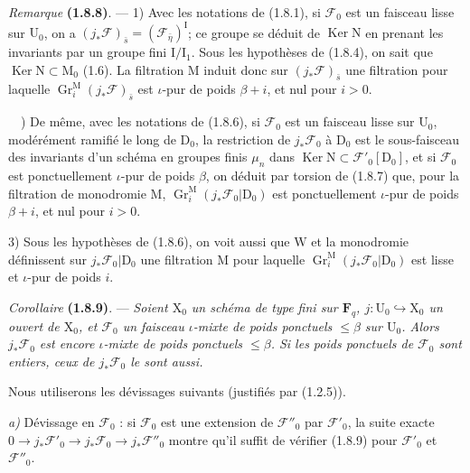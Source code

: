 \documentclass[11pt,leqno]{article}
\newcommand{\Page}[1]{\ifvmode\noindent\else\unskip\ \fi{\footnotesize\textcolor{gray}{[p.\,#1]}}\ \ignorespaces}
\begin{document}
\textit{Remarque} \textbf{(1.8.8)}. — 1) Avec les notations de (1.8.1), si \(\mathscr{F}_0\) est un faisceau lisse sur \(\mathrm{U}_0\), on a \((j_*\mathscr{F})_{\bar{s}}=(\mathscr{F}_{\bar{\eta}})^{\mathrm{I}}\); ce groupe se déduit de \(\operatorname{Ker}\mathrm{N}\) en prenant les invariants par un groupe fini \(\mathrm{I}/\mathrm{I}_1\). Sous les hypothèses de (1.8.4), on sait que \(\operatorname{Ker}\mathrm{N}\subset\mathrm{M}_0\) (1.6). La filtration \(\mathrm{M}\) induit donc sur \((j_*\mathscr{F})_{\bar{s}}\) une filtration pour laquelle \(\operatorname{Gr}_i^{\mathrm{M}}(j_*\mathscr{F})_{\bar{s}}\) est \(\iota\)-pur de poids \(\beta+i\), et nul pour \(i>0\).

\Page{177}
2) De même, avec les notations de (1.8.6), si \(\mathscr{F}_0\) est un faisceau lisse sur \(\mathrm{U}_0\), modérément ramifié le long de \(\mathrm{D}_0\), la restriction de \(j_*\mathscr{F}_0\) à \(\mathrm{D}_0\) est le sous-faisceau des invariants d’un schéma en groupes finis \(\mu_n\) dans \(\operatorname{Ker}\mathrm{N}\subset\mathscr{F}'_0[\mathrm{D}_0]\), et si \(\mathscr{F}_0\) est ponctuellement \(\iota\)-pur de poids \(\beta\), on déduit par torsion de (1.8.7) que, pour la filtration de monodromie \(\mathrm{M}\), \(\operatorname{Gr}_i^{\mathrm{M}}(j_*\mathscr{F}_0\vert\mathrm{D}_0)\) est ponctuellement \(\iota\)-pur de poids \(\beta+i\), et nul pour \(i>0\).

3) Sous les hypothèses de (1.8.6), on voit aussi que \(\mathrm{W}\) et la monodromie définissent sur \(j_*\mathscr{F}_0\vert\mathrm{D}_0\) une filtration \(\mathrm{M}\) pour laquelle \(\operatorname{Gr}_i^{\mathrm{M}}(j_*\mathscr{F}_0\vert\mathrm{D}_0)\) est lisse et \(\iota\)-pur de poids \(i\).

\textit{Corollaire} \textbf{(1.8.9)}. — \textit{Soient \(\mathrm{X}_0\) un schéma de type fini sur \(\mathbf{F}_q\), \(j:\mathrm{U}_0\hookrightarrow\mathrm{X}_0\) un ouvert de \(\mathrm{X}_0\), et \(\mathscr{F}_0\) un faisceau \(\iota\)-mixte de poids ponctuels \(\leq\beta\) sur \(\mathrm{U}_0\). Alors \(j_*\mathscr{F}_0\) est encore \(\iota\)-mixte de poids ponctuels \(\leq\beta\). Si les poids ponctuels de \(\mathscr{F}_0\) sont entiers, ceux de \(j_*\mathscr{F}_0\) le sont aussi.}

Nous utiliserons les dévissages suivants (justifiés par (1.2.5)).

\textit{a)} Dévissage en \(\mathscr{F}_0\) : si \(\mathscr{F}_0\) est une extension de \(\mathscr{F}''_0\) par \(\mathscr{F}'_0\), la suite exacte \(0\to j_*\mathscr{F}'_0\to j_*\mathscr{F}_0\to j_*\mathscr{F}''_0\) montre qu’il suffit de vérifier (1.8.9) pour \(\mathscr{F}'_0\) et \(\mathscr{F}''_0\).
\end{document}
